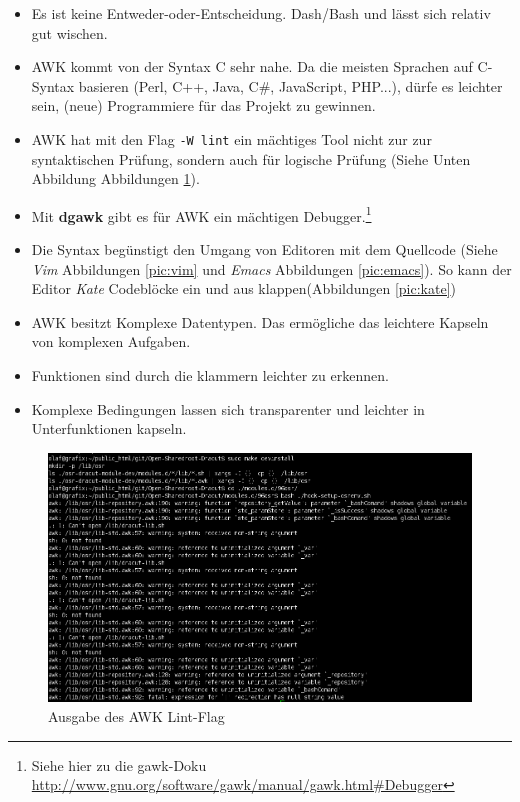 \documentclass[10pt,a4paper]{article}
\begin{document}
\begin{itemize}
 \item Es ist keine Entweder-oder-Entscheidung. Dash/Bash und lässt sich relativ gut wischen.
 \item AWK kommt von der Syntax C sehr nahe. Da die meisten Sprachen auf C-Syntax
       basieren (Perl, C++, Java, C\#, JavaScript, PHP...), dürfe es leichter sein,
       (neue) Programmiere für das Projekt zu gewinnen.
 \item AWK hat mit den Flag \verb|-W lint|  ein mächtiges Tool nicht zur
       zur syntaktischen Prüfung, sondern auch für logische Prüfung (Siehe Unten
       Abbildung Abbildungen \ref{pic:lint}).
 \item Mit \textbf{dgawk} gibt es für AWK ein mächtigen Debugger.\footnote{Siehe
       hier zu die gawk-Doku \url{http://www.gnu.org/software/gawk/manual/gawk.html\#Debugger}}
 \item Die Syntax begünstigt den Umgang von Editoren mit dem Quellcode (Siehe \textit{Vim}
       Abbildungen \ref{pic:vim} und \textit{Emacs} Abbildungen \ref{pic:emacs}). So kann
       der Editor \textit{Kate} Codeblöcke ein und aus klappen(Abbildungen \ref{pic:kate})
 \item AWK besitzt Komplexe Datentypen. Das ermögliche das leichtere Kapseln von
       komplexen Aufgaben.
 \item Funktionen sind durch die klammern leichter zu erkennen.
 \item Komplexe Bedingungen lassen sich transparenter und leichter in Unterfunktionen
       kapseln.
\end{itemize}

\begin{figure}[H]
 \centering
 \includegraphics[width=1.0\textwidth]{./awk-lint.png}
 \caption[]{Ausgabe des AWK Lint-Flag}
 \label{pic:lint} 
\end{figure}
\end{document}
